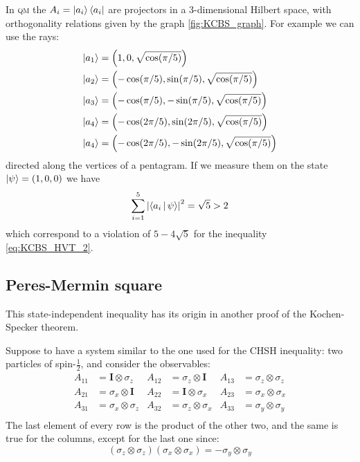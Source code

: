 \documentclass[a4paper]{article}
\newcommand{\acron}[1]{\textsc{#1}}
\newcommand{\QM}{\acron{qm}}
\newcommand{\I}{\mathbf{I}}
\theoremstyle{definition}
\begin{document}
In \QM{} the $A_i = \Ket{a_i}\Bra{a_i}$ are projectors in a 3-dimensional
Hilbert space, with orthogonality relations given by the graph
\ref{fig:KCBS_graph}.
For example we can use the rays:
\begin{align}
    \Ket{a_1} &= \left(1,0,\sqrt{\cos(\pi/5)}\right) \\
    \Ket{a_2} &= \left(-\cos(\pi/5),\sin(\pi/5),\sqrt{\cos(\pi/5)}\right)\\ 
    \Ket{a_3} &=\left(-\cos(\pi/5),-\sin(\pi/5),\sqrt{\cos(\pi/5)}\right)\\
    \Ket{a_4} &= \left(-\cos(2\pi/5),\sin(2\pi/5),\sqrt{\cos(\pi/5)}\right)\\
    \Ket{a_4} &=\left(-\cos(2\pi/5),-\sin(2\pi/5),\sqrt{\cos(\pi/5)}\right)\\
    \label{eq:KCBS_rays}
\end{align}
directed along the vertices of a pentagram.
If we measure them on the state $\Ket{\psi} = (1,0,0)$ we have
\begin{equation}
    \sum_{i=1}^5 \left|\Braket{a_i|\psi}\right|^2 = \sqrt{5} > 2
    \label{eq:KCBS_QM_1}
\end{equation}
which correspond to a violation of $5-4\sqrt{5}$ for the inequality
\eqref{eq:KCBS_HVT_2}.
\subsection{Peres-Mermin square}
\label{sec:PM_square}
This state-independent inequality has its origin in another proof of the
Kochen-Specker theorem.

Suppose to have a system similar to the one used for the \acron{CHSH}
inequality: two particles of spin-$\frac{1}{2}$, and consider the
observables:
\begin{align}
    A_{11}&=\I\otimes\sigma_z  &A_{12}&=\sigma_z\otimes\I &A_{13}&=\sigma_z\otimes\sigma_z \\
    A_{21}&=\sigma_x\otimes\I  &A_{22}&=\I\otimes\sigma_x &A_{23}&=\sigma_x\otimes\sigma_x \\
    A_{31}&=\sigma_x\otimes\sigma_z  &A_{32}&=\sigma_z\otimes\sigma_x &A_{33}&=\sigma_y\otimes\sigma_y \\
    \label{eq:PM_square}
\end{align}
The last element of every row is the product of the other two, and the same
is true for the columns, except for the last one since: 
\begin{equation}
    (\sigma_z\otimes\sigma_z) (\sigma_x\otimes\sigma_x) = - \sigma_y\otimes\sigma_y
    \label{eq:PM_lastcol}
\end{equation}
\end{document}
